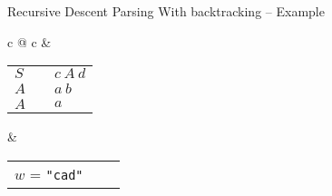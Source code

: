 \documentclass{beamer}
\begin{document}
\begin{frame}{Recursive Descent Parsing}
{With backtracking -- Example}

\begin{tabular}{c @{\hspace{1cm}} c}
 &  \\

\begin{minipage}{0.4\textwidth}

\begin{tabular}{l @{} c @{} l}
$S$ & {\myprod} & $c\ A\ d$ \\
$A$ & {\myprod} & $a\ b$    \\
$A$ & {\myprod} & $a$
\end{tabular}

\end{minipage}
&
\begin{minipage}{0.4\textwidth}
\begin{tabular}{l @{} c @{} l}

$w$ = \texttt{"cad"}
\end{tabular}
\end{minipage}
\end{tabular}

\end{frame}
\end{document}
